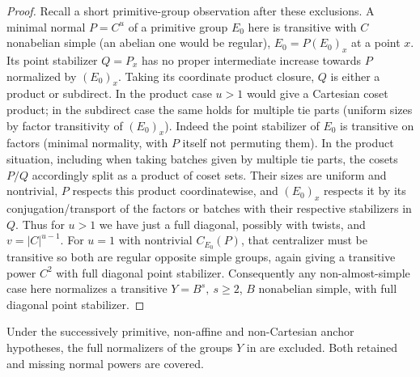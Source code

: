 \begin{proof}
Recall a short primitive-group observation after these exclusions. A minimal normal \(P=C^u\) of a primitive group \(E_0\) here is transitive with \(C\) nonabelian simple (an abelian one would be regular), \(E_0=P(E_0)_x\) at a point \(x\). Its point stabilizer \(Q=P_x\) has no proper intermediate increase towards \(P\) normalized by \((E_0)_x\). Taking its coordinate product closure, \(Q\) is either a product or subdirect. In the product case \(u>1\) would give a Cartesian coset product; in the subdirect case the same holds for multiple tie parts (uniform sizes by factor transitivity of \((E_0)_x\)). Indeed the point stabilizer of \(E_0\) is transitive on factors (minimal normality, with \(P\) itself not permuting them). In the product situation, including when taking batches given by multiple tie parts, the cosets \(P/Q\) accordingly split as a product of coset sets. Their sizes are uniform and nontrivial, \(P\) respects this product coordinatewise, and \((E_0)_x\) respects it by its conjugation/transport of the factors or batches with their respective stabilizers in \(Q\). Thus for \(u>1\) we have just a full diagonal, possibly with twists, and \(v=|C|^{u-1}\). For \(u=1\) with nontrivial \(C_{E_0}(P)\), that centralizer must be transitive so both are regular opposite simple groups, again giving a transitive power \(C^2\) with full diagonal point stabilizer. Consequently any non-almost-simple case here normalizes a transitive \(Y=B^s,\ s\ge2\), \(B\) nonabelian simple, with full diagonal point stabilizer.
\end{proof}

\begin{proposition}\label{c:diagonal-pruning}
Under the successively primitive, non-affine and non-Cartesian anchor hypotheses, the full normalizers of the groups \(Y\) in  are excluded. Both retained and missing normal powers are covered.
\end{proposition}

